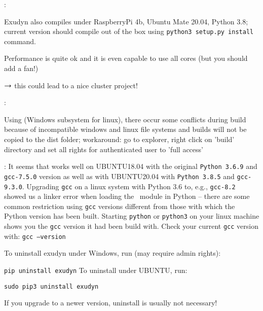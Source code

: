 \noindent {}:
\bi
  \item Exudyn also compiles under RaspberryPi 4b, Ubuntu Mate 20.04, Python 3.8; current version should compile out of the box using \texttt{python3 setup.py install} command.
  \item Performance is quite ok and it is even capable to use all cores (but you should add a fan!)
  \item $\rightarrow$ this could lead to a nice cluster project!
\ei

\noindent {}:
\bi
  \item Using  (Windows subsystem for linux), there occur some conflicts during build because of incompatible windows and linux file systems and builds will not be copied to the dist folder; workaround: go to explorer, right click on 'build' directory and set all rights for authenticated user to 'full access'
  \item {}: It seems that \codeName works well on UBUNTU18.04 with the original \texttt{Python 3.6.9} and \texttt{gcc-7.5.0} version as well as with UBUNTU20.04 with \texttt{Python 3.8.5} and \texttt{gcc-9.3.0}. Upgrading \texttt{gcc} on a linux system with Python 3.6 to, e.g., \texttt{gcc-8.2} showed us a linker error when loading the \codeName\ module in Python -- there are some common restriction using \texttt{gcc} versions different from those with which the Python version has been built. Starting \texttt{python} or \texttt{python3} on your linux machine shows you the \texttt{gcc} version it had been build with. Check your current \texttt{gcc} version with: \texttt{gcc --version}
\ei


To uninstall exudyn under Windows, run (may require admin rights):
\bi
  \item[] \texttt{pip uninstall exudyn}
\ei
\noindent To uninstall under UBUNTU, run:
\bi
  \item[] \texttt{sudo pip3 uninstall exudyn}
\ei

If you upgrade to a newer version, uninstall is usually not necessary!
%

